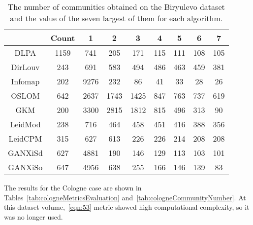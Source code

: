 \begin{table}[ht]%
	\centering
	\caption{The number of communities obtained on the Biryulevo dataset and the value of the seven largest of them for each algorithm.}%
	\label{tab:biryulevoCommunityNumber}%
		\begin{tabular}{ c  c  c  c  c  c  c  c  c }%
			\toprule
			& Count & 1 & 2 & 3 & 4 & 5 & 6 & 7\\
			\hline
			DLPA & 1159 & 741 & 205 & 171 & 115 & 111 & 108 & 105 \\
			DirLouv & 243 & 691 & 583 & 494 & 486 & 463 & 459 & 381 \\
			Infomap & 202 & 9276 & 232 & 86 & 41 & 33 & 28 & 26 \\
			OSLOM & 642 & 2637 & 1743 & 1425 & 847 & 763 & 737 & 619\\
			GKM & 200 & 3300 & 2815 & 1812 & 815 & 496 & 313 & 90 \\
			LeidMod & 238 & 716 & 464 & 458 & 451 & 416 & 388 & 356\\
			LeidCPM & 315 & 627 & 613 & 226 & 226 & 214 & 208 & 208 \\
			GANXiSd & 627 & 4881 & 190 & 146 & 129 & 113 & 103 & 101 \\
			GANXiSo & 647 & 4956 & 638 & 255 & 166 & 146 & 139 & 83 \\
			\bottomrule
		\end{tabular}%
\end{table}

The results for the Cologne case are shown in Tables~\cref{tab:cologneMetricsEvaluation} and~\cref{tab:cologneCommunityNumber}. At this dataset volume,~\cref{eqn:53} metric showed high computational complexity, so it was no longer used.

